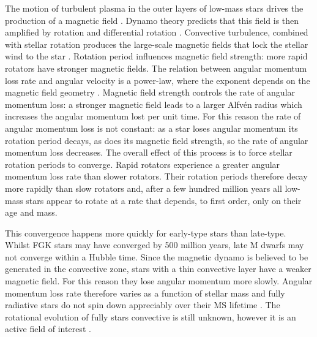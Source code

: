 The motion of turbulent plasma in the outer layers of low-mass stars drives
the production of a magnetic field \citep[][]{Schatzman1962}.
Dynamo theory predicts that this field is then amplified by rotation and
differential rotation \citep[\eg][]{Parker1970}.
Convective turbulence, combined with stellar rotation produces the large-scale
magnetic fields that lock the stellar wind to the star
\citep[\eg][]{Charbonneau2010}.
Rotation period influences magnetic field strength: more rapid rotators have
stronger magnetic fields.
The relation between angular momentum loss rate and angular velocity is a
power-law, where the exponent depends on the magnetic field geometry
\citet{Mestel1984, Kawaler1988}.
Magnetic field strength controls the rate of angular momentum loss: a stronger
magnetic field leads to a larger Alfv{\'e}n radius which increases the angular
momentum lost per unit time.
For this reason the rate of angular momentum loss is not constant: as a star
loses angular momentum its rotation period decays, as does its magnetic field
strength, so the rate of angular momentum loss decreases.
The overall effect of this process is to force stellar rotation periods to
converge.
Rapid rotators experience a greater angular momentum loss rate than slower
rotators.
Their rotation periods therefore decay more rapidly than slow rotators and,
after a few hundred million years all low-mass stars appear to rotate at a
rate that depends, to first order, only on their age and mass.

This convergence happens more quickly for early-type stars than late-type.
Whilst FGK stars may have converged by 500 million years, \citep{Radick1987,
Irwin2009} late M dwarfs may not converge within a Hubble time.
Since the magnetic dynamo is believed to be generated in the convective zone,
stars with a thin convective layer have a weaker magnetic field.
For this reason they lose angular momentum more slowly.
Angular momentum loss rate therefore varies as a function of stellar mass and
fully radiative stars do not spin down appreciably over their MS lifetime
\citep{Noyes1984b}.
The rotational evolution of fully stars convective is still unknown, however
it is an active field of interest \citep[\eg][]{Mcquillan2013, Newton2015}.

